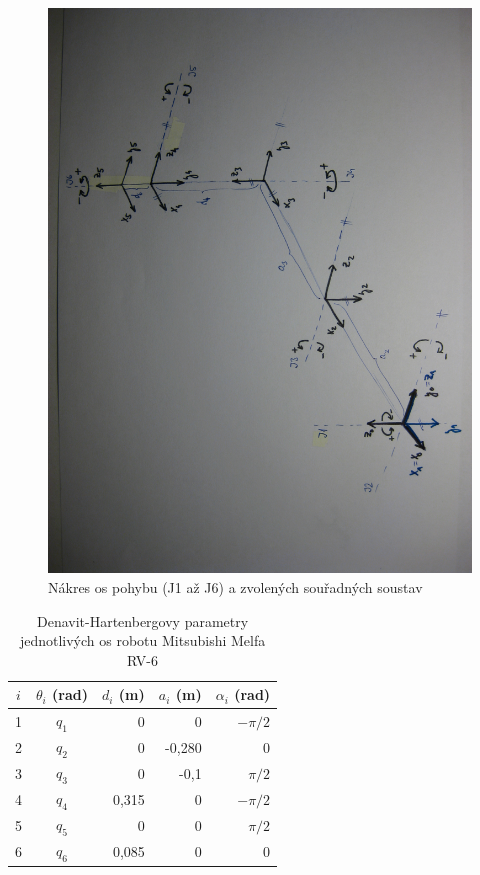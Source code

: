 \documentclass[11pt,oneside,a4paper,pdftex]{article}   %
\begin{document}
\begin{figure}[htb]
	\centering
	\includegraphics[width=15.3cm]{pictures/img_5916.jpg}
	\caption{Nákres os pohybu (J1 až J6) a zvolených souřadných soustav}
	\label{fig:soustavy}
\end{figure}


\begin{table}[htb]
	\centering
	\begin{tabular}{|c|c|r|r|r|}
		\hline
		$i$	& $\theta_i$ (rad)	& $d_i$ (m)				& $a_i$	(m)			& $\alpha_i$ (rad)\\
		\hline
		1	& $q_1$				& 0\phantom{,000}		& 0\phantom{,000}	& $-\pi/2$	\\
		2	& $q_2$				& 0\phantom{,000}     	&-0,280				& 0			\\
		3	& $q_3$				& 0\phantom{,000}     	&-0,1\phantom{00}	& $\pi/2$	\\
		4	& $q_4$				& 0,315					& 0\phantom{,000}	& $-\pi/2$	\\
		5	& $q_5$				& 0\phantom{,000}     	& 0\phantom{,000}  	& $\pi/2$	\\
		6	& $q_6$				& 0,085					& 0\phantom{,000}  	& 0			\\
		\hline
	\end{tabular}
	\caption{Denavit-Hartenbergovy parametry jednotlivých os robotu Mitsubishi Melfa RV-6}
	\label{tab:DH_parametry}
\end{table}
\end{document}
